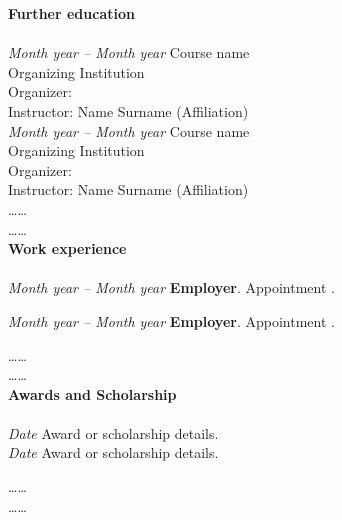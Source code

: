 \documentclass[10pt]{amsart}
\begin{document}
	
	
	{\large {\bf Further education}} \\[-.08cm] 
	\underline{\hspace{6in}} \\[.2cm] 
	{\it Month year -- Month year}\newline
	Course name\\
	Organizing Institution\\
	Organizer: \\
	Instructor: Name Surname (Affiliation) \\ 
	
	
	
	{\it Month year -- Month year}\newline
	Course name\\
	Organizing Institution\\
	Organizer: \\
	Instructor: Name Surname (Affiliation) \\ 
	
	
	
	\ldots\ldots\\
	\ldots\ldots\\
	
	
	{\large {\bf Work experience}} \\[-.08cm] 
	\underline{\hspace{6in}} \\[.2cm] 
	{\it Month year -- Month year}\newline
	{\bf Employer}. \newline
	Appointment .
	\newline
	
	
	{\it Month year -- Month year}\newline
	{\bf Employer}. \newline
	Appointment .
	\newline
	
	
	\ldots\ldots\\
	\ldots\ldots\\	
	{\large {\bf Awards and Scholarship}} \\[-.08cm] 
	\underline{\hspace{6in}} \\[.2cm]
	{\it Date}\newline
	Award or scholarship details. \\
	
	
	{\it Date}\newline
	Award or scholarship details. 
	
	\ldots\ldots\\
	\ldots\ldots\\	
	
\end{document}
